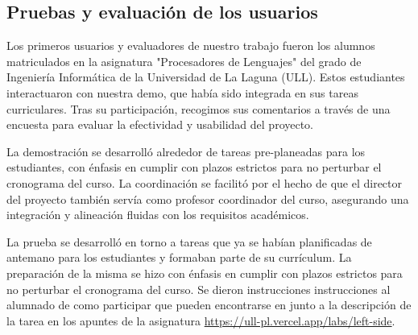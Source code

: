 \subsection{Pruebas y evaluación de los usuarios}

Los primeros usuarios y evaluadores de nuestro trabajo fueron los alumnos matriculados en la asignatura "Procesadores de Lenguajes" del grado de Ingeniería Informática de la Universidad de La Laguna (\acrshort{ULL}). Estos estudiantes interactuaron con nuestra demo, que había sido  integrada en sus tareas curriculares. Tras su participación, recogimos sus comentarios a través de una encuesta para evaluar la efectividad y usabilidad del proyecto.

La demostración se desarrolló alrededor de tareas pre-planeadas para los estudiantes, con énfasis en cumplir con plazos estrictos para no perturbar el cronograma del curso. La coordinación se facilitó por el hecho de que el director del proyecto también servía como profesor coordinador del curso, asegurando una integración y alineación fluidas con los requisitos académicos.

La prueba se desarrolló en torno a  tareas  que ya se habían planificadas de antemano para los estudiantes y formaban parte de su currículum. La preparación de la misma se hizo con énfasis en cumplir con plazos estrictos para no perturbar el cronograma del curso.  Se dieron instrucciones instrucciones al alumnado de como participar que pueden encontrarse 
en junto a la descripción de la tarea en los apuntes de la asignatura \url{https://ull-pl.vercel.app/labs/left-side}.

